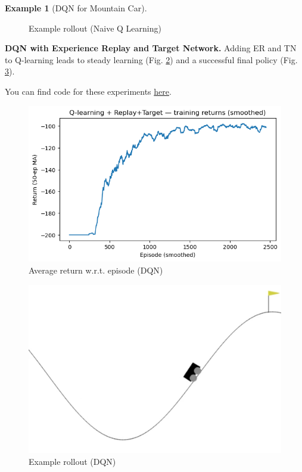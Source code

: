 \documentclass[
]{book}
\theoremstyle{definition}
\theoremstyle{definition}
\newtheorem{example}{Example}[chapter]
\theoremstyle{definition}
\theoremstyle{definition}
\theoremstyle{remark}
\begin{document}
\begin{example}[DQN for Mountain Car]
\begin{figure}
{}

\caption{Example rollout (Naive Q Learning)}\label{fig:Mountain-car-q-rollout}
\end{figure}

\textbf{DQN with Experience Replay and Target Network.} Adding ER and TN to Q-learning leads to steady learning (Fig. \ref{fig:Mountain-car-dqn-episode-return}) and a successful final policy (Fig. \ref{fig:Mountain-car-dqn-rollout}).

You can find code for these experiments \href{https://github.com/ComputationalRobotics/2025-ES-AM-158-LECTURE-CODE/blob/main/mountaincar_q_learning.py}{here}.

\begin{figure}

{\centering \includegraphics[width=0.6\linewidth]{images/Value-RL/mountain-car_dqn_eps2500_seed123_returns} 

}

\caption{Average return w.r.t. episode (DQN)}\label{fig:Mountain-car-dqn-episode-return}
\end{figure}

\begin{figure}

{\centering \includegraphics[width=0.6\linewidth]{images/Value-RL/mountain-car_dqn_eps2500_seed123_greedy-episode-0} 

}

\caption{Example rollout (DQN)}\label{fig:Mountain-car-dqn-rollout}
\end{figure}

\end{example}
\end{document}
